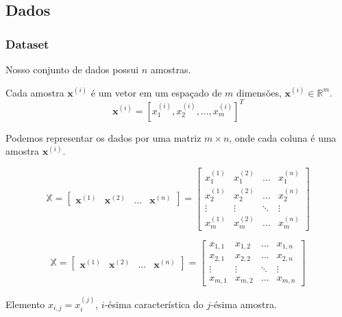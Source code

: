 \subsection{Dados}
\begin{frame}[allowframebreaks]
  \frametitle{Dataset}
  
  Nosso conjunto de dados possui $n$ amostras.
  
  Cada amostra $\mathbf{x}^{(i)}$ é um vetor em um espaçado de $m$ dimensões, $\mathbf{x}^{(i)} \in \mathbb{R}^m$.
  \begin{equation}
  \mathbf{x}^{(i)} = [x_1^{(i)}, x_2^{(i)}, \ldots, x_m^{(i)}]^T
  \end{equation}
  
  Podemos representar os dados por uma matriz $m \times n$, onde cada coluna é uma amostra $\mathbf{x}^{(i)}$.
  
  \begin{equation}
  \mathbb{X} = \begin{bmatrix} \mathbf{x}^{(1)} & \mathbf{x}^{(2)} & \ldots & \mathbf{x}^{(n)} \end{bmatrix}  = 
  \begin{bmatrix}
  x_{1}^{(1)} & x_{1}^{(2)} & \ldots & x_{1}^{(n)} \\
  x_{2}^{(1)} & x_{2}^{(2)} & \ldots & x_{2}^{(n)} \\
  \vdots  & \vdots  & \ddots & \vdots  \\
  x_{m}^{(1)} & x_{m}^{(2)} & \ldots & x_{m}^{(n)}
  \end{bmatrix}  
  \end{equation}
 
  \framebreak
  
  \begin{equation}
  \mathbb{X} = \begin{bmatrix} \mathbf{x}^{(1)} & \mathbf{x}^{(2)} & \ldots & \mathbf{x}^{(n)} \end{bmatrix}  = 
  \begin{bmatrix}
  x_{1,1} & x_{1,2} & \ldots & x_{1,n} \\
  x_{2,1} & x_{2,2} & \ldots & x_{2,n} \\
  \vdots  & \vdots  & \ddots & \vdots  \\
  x_{m,1} & x_{m,2} & \ldots & x_{m,n}
  \end{bmatrix}  
  \end{equation}

  Elemento $x_{i,j} = x_{i}^{(j)}$, $i$-ésima característica do $j$-ésima amostra.
\end{frame}

